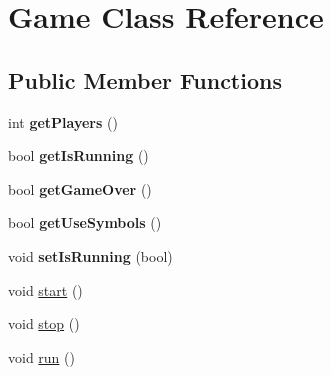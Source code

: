 \hypertarget{class_game}{\section{Game Class Reference}
\label{class_game}
}
\subsection*{Public Member Functions}
\begin{DoxyCompactItemize}
\item 
\hypertarget{class_game_aee3b6eabbe52f211530e0f4da9a06081}{int {\bfseries get\+Players} ()}\label{class_game_aee3b6eabbe52f211530e0f4da9a06081}

\item 
\hypertarget{class_game_a03442bac816f9e80710e628b8b78b3e2}{bool {\bfseries get\+Is\+Running} ()}\label{class_game_a03442bac816f9e80710e628b8b78b3e2}

\item 
\hypertarget{class_game_a2ab13a3be1b7de58174899538c21868a}{bool {\bfseries get\+Game\+Over} ()}\label{class_game_a2ab13a3be1b7de58174899538c21868a}

\item 
\hypertarget{class_game_a79103e8219933eb2460d68e6d54b1bc1}{bool {\bfseries get\+Use\+Symbols} ()}\label{class_game_a79103e8219933eb2460d68e6d54b1bc1}

\item 
\hypertarget{class_game_af0bc0fb1ee696d8dbdf82de52395e2d7}{void {\bfseries set\+Is\+Running} (bool)}\label{class_game_af0bc0fb1ee696d8dbdf82de52395e2d7}

\item 
void \hyperlink{class_game_a3d9b98f7c4a96ecf578f75b96c9f0e90}{start} ()
\item 
void \hyperlink{class_game_a17fbb36fd4a2085f9ff4f1fa93d7d08b}{stop} ()
\item 
void \hyperlink{class_game_a1ab78f5ed0d5ea879157357cf2fb2afa}{run} ()
\end{DoxyCompactItemize}


